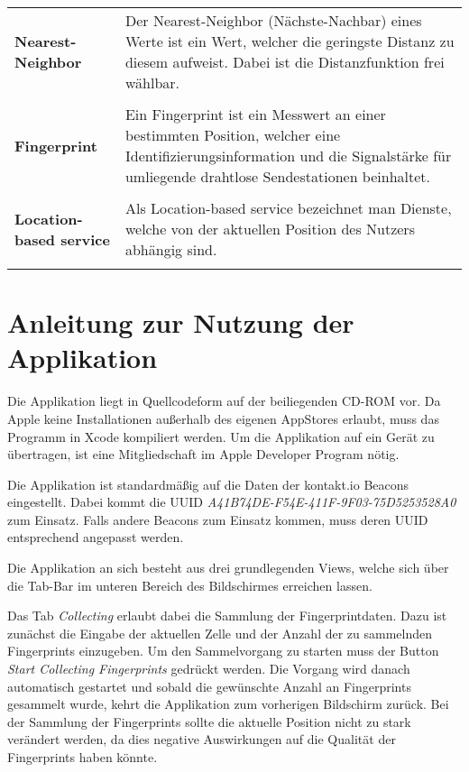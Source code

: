  \begin{tabular}[t]{lp{10cm}}
	\textbf{Nearest-Neighbor} & Der Nearest-Neighbor (Nächste-Nachbar) eines Werte ist ein Wert, welcher die geringste Distanz zu diesem aufweist. Dabei ist die Distanzfunktion frei wählbar. \\ \\
	\textbf{Fingerprint} & Ein Fingerprint ist ein Messwert an einer bestimmten Position, welcher eine Identifizierungsinformation und die Signalstärke für umliegende drahtlose Sendestationen beinhaltet.\\ \\
  	\textbf{Location-based service} & Als Location-based service bezeichnet man Dienste, welche von der aktuellen Position des Nutzers abhängig sind. \\ \\
  \end{tabular}
  
  
\chapter{Anleitung zur Nutzung der Applikation}

Die Applikation liegt in Quellcodeform auf der beiliegenden CD-ROM vor. Da Apple keine Installationen außerhalb des eigenen AppStores erlaubt, muss das Programm in Xcode kompiliert werden. Um die Applikation auf ein Gerät zu übertragen, ist eine Mitgliedschaft im Apple Developer Program nötig.

Die Applikation ist standardmäßig auf die Daten der kontakt.io Beacons eingestellt. Dabei kommt die UUID \emph{A41B74DE-F54E-411F-9F03-75D5253528A0} zum Einsatz. Falls andere Beacons zum Einsatz kommen, muss deren UUID entsprechend angepasst werden. 

Die Applikation an sich besteht aus drei grundlegenden Views, welche sich über die Tab-Bar im unteren Bereich des Bildschirmes erreichen lassen. 

Das Tab \emph{Collecting} erlaubt dabei die Sammlung der Fingerprintdaten. Dazu ist zunächst die Eingabe der aktuellen Zelle und der Anzahl der zu sammelnden Fingerprints einzugeben. Um den Sammelvorgang zu starten muss der Button \emph{Start Collecting Fingerprints} gedrückt werden. Die Vorgang wird danach automatisch gestartet und sobald die gewünschte Anzahl an Fingerprints gesammelt wurde, kehrt die Applikation zum vorherigen Bildschirm zurück. 
Bei der Sammlung der Fingerprints sollte die aktuelle Position nicht zu stark verändert werden, da dies negative Auswirkungen auf die Qualität der Fingerprints haben könnte.

